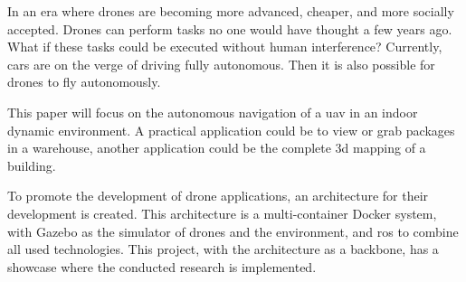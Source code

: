 In an era where drones are becoming more advanced, cheaper, and more socially accepted. Drones can perform tasks no one would have thought a few years ago. What if these tasks could be executed without human interference? Currently, cars are on the verge of driving fully autonomous. Then it is also possible for drones to fly autonomously.

This paper will focus on the autonomous navigation of a \acs{uav} in an indoor dynamic environment. A practical application could be to view or grab packages in a warehouse, another application could be the complete \acs{3d} mapping of a building.

To promote the development of drone applications, an architecture for their development is created. This architecture is a multi\hyp{}container Docker system, with Gazebo as the simulator of drones and the environment, and \acs{ros} to combine all used technologies. This project, with the architecture as a backbone, has a showcase where the conducted research is implemented.